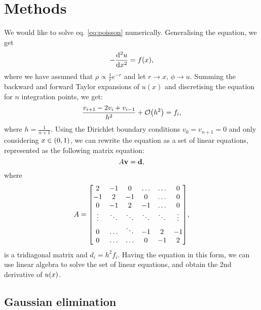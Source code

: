 \section{Methods}
\label{sec:methods}

We would like to solve eq. \ref{eq:poisson} numerically. Generalising the
equation, we get
  \begin{equation}
    -\dv[2]{u}{x} = f\qty(x),
  \end{equation}
where we have assumed that $\rho \propto \frac{1}{r}e^{-r}$ and let $ r
\rightarrow x$, $\phi \rightarrow u$.
Summing the backward and forward Taylor expansions of $u(x)$ and discretising
the equation for $n$ integration points, we get:
  \begin{equation}
  \label{eq:approx}
    \frac{v_{i+1} - 2v_i + v_{i-1}}{h^2} + \order{h^2} = f_i,
  \end{equation}
where $h = \frac{1}{n+1}$. Using the Dirichlet boundary conditions
$v_0 = v_{n+1} = 0$ and only considering $x\in\qty(0, 1)$, we can rewrite the
equation as a set of linear equations, represented as the following matrix
equation:
  \begin{equation}
  \label{eq:matrixeq}
    A\vb{v} = \vb{d},
  \end{equation}
where
  \[A =
    \mqty[2 & -1 & 0 & \hdots & \hdots & 0 \\
          -1 & 2 & -1 & 0 & \hdots & 0 \\
          0 & -1 & 2 & -1 & \hdots & 0 \\
          \vdots & \ddots & \ddots & \ddots & \ddots & \vdots \\
          0 & \hdots & \ddots & -1 & 2 & -1 \\
          0 & \hdots & \hdots & 0 & -1 & 2],
  \]
is a tridiagonal matrix and $d_i = h^2f_i$.
Having the equation in this form, we can use linear algebra to solve the set of
linear equations, and obtain the 2nd derivative of $u\qty(x)$.


\subsection{Gaussian elimination}
\label{sec:gaussian}

